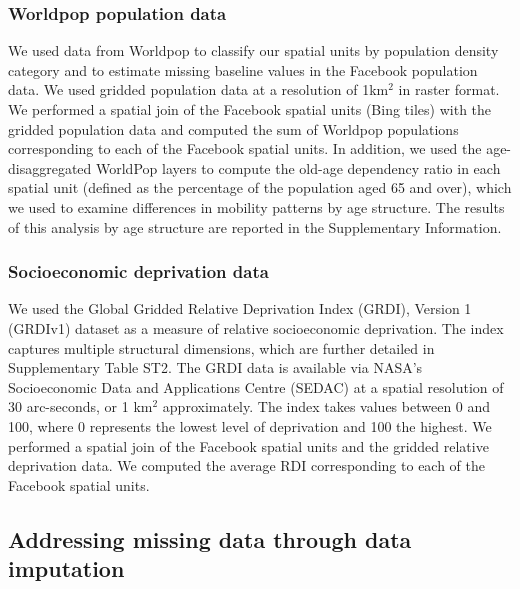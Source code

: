 \documentclass[fleqn,10pt]{wlscirep}
\begin{document}
\subsubsection*{Worldpop population data}

We used data from Worldpop \cite{tatem2017} to classify our spatial units by population density category and to estimate missing baseline values in the Facebook population data.
We used gridded population data at a resolution of 1km$^2$ in raster format. We performed a spatial join of the Facebook spatial units (Bing tiles) with the gridded population data and computed the sum of Worldpop populations corresponding to each of the Facebook spatial units. In addition, we used the age-disaggregated WorldPop layers to compute the old-age dependency ratio in each spatial unit (defined as the percentage of the population aged 65 and over), which we used to examine differences in mobility patterns by age structure. The results of this analysis by age structure are reported in the Supplementary Information.

\subsubsection*{Socioeconomic deprivation data} 

We used the Global Gridded Relative Deprivation Index (GRDI), Version 1 (GRDIv1) \cite{RDI2022} dataset as a measure of relative socioeconomic deprivation. The index captures multiple structural dimensions, which are further detailed in Supplementary Table ST2. The GRDI data is available via NASA's Socioeconomic Data and Applications Centre (SEDAC) at a spatial resolution of 30 arc-seconds, or 1 km$^2$ approximately. The index takes values between 0 and 100, where 0 represents the lowest level of deprivation and 100 the highest. We performed a spatial join of the Facebook spatial units and the gridded relative deprivation data. We computed the average RDI corresponding to each of the Facebook spatial units.


\subsection*{Addressing missing data through data imputation} 
\end{document}
